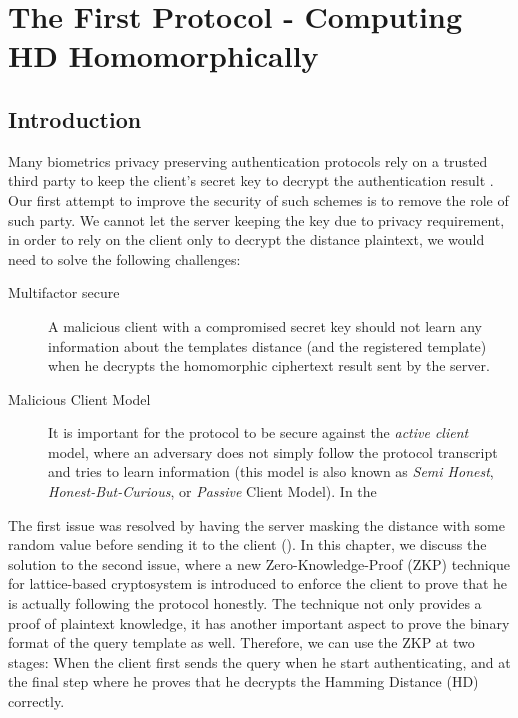 \chapter{The First Protocol - Computing HD Homomorphically}

\ifpdf
    \graphicspath{{Chapter3/Figs/Raster/}{Chapter3/Figs/PDF/}{Chapter3/Figs/}}
\else
    \graphicspath{{Chapter3/Figs/Vector/}{Chapter3/Figs/}}
\fi

\section{Introduction}
\label{sec:firstProcIntro}
Many biometrics privacy preserving authentication protocols rely on a trusted
third party to keep the client's secret key to decrypt the authentication result
\missref{}. Our first attempt to improve the security of such schemes is to
remove the role of such party. We cannot let the server keeping the key due to
privacy requirement, in order to rely on the client only to decrypt the distance
plaintext, we would need to solve the following challenges:
\begin{description}
\item[Multifactor secure] A malicious client with a compromised secret key
  should not learn any information about the templates distance (and the
  registered template) when he decrypts the homomorphic ciphertext result sent
  by the server.
\item[Malicious Client Model] It is important for the protocol to be secure
  against the \textit{active client }model, where an adversary does not simply follow the
  protocol transcript and tries to learn information (this model is also known
  as \textit{Semi Honest}, \textit{Honest-But-Curious}, or \textit{Passive} Client Model). In the 
\end{description}

The first issue was resolved by having the server masking the distance with some
random value before sending it to the client
(\cite{mandal2015comprehensive}). In this chapter, we discuss the solution to
the second issue, where a new Zero-Knowledge-Proof (ZKP) technique for
lattice-based cryptosystem is introduced to enforce the client to prove that he
is actually following the protocol honestly. The technique not only provides a
proof of plaintext knowledge, it has another important aspect to prove the
binary format of the query template as well. Therefore, we can use the ZKP at
two stages: When the client first sends the query when he start authenticating,
and at the final step where he proves that he decrypts the Hamming Distance (HD)
correctly.


